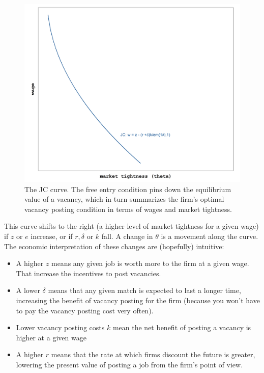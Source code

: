\documentclass[12pt]{article}
\begin{document}
\begin{figure}
\begin{center}
	\includegraphics[height = .33\textheight]{jc.png}
\end{center}
\caption{The JC curve.  The free entry condition pins down the equilibrium value of a vacancy, which in turn summarizes the firm's optimal vacancy posting condition in terms of wages and market tightness.}\label{fig:JC}
\end{figure}

This curve shifts to the right (a higher level of market tightness for a given wage) if $z$ or $e$ increase, or if $r, \delta$ or $k$ fall.  A change in $\theta$ is a movement along the curve.  The economic interpretation of these changes are (hopefully) intuitive:
\begin{itemize}
	\item  A higher $z$ means any given job is worth more to the firm at a given wage.  That increase the incentives to post vacancies.
	\item A lower $\delta$ means that any given match is expected to last a longer time, increasing the benefit of vacancy posting for the firm (because you won't have to pay the vacancy posting cost very often).
	\item Lower vacancy posting costs $k$ mean the net benefit of posting a vacancy is higher at a given wage
	\item A higher $r$ means that the rate at which firms discount the future is greater, lowering the present value of posting a job from the firm's point of view. 
\end{itemize} 
\end{document}
